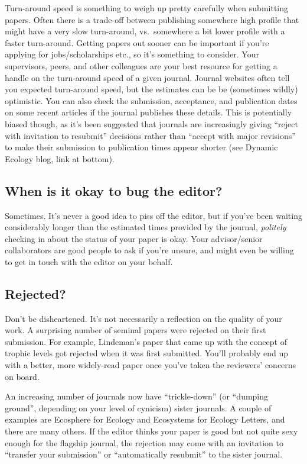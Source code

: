 \documentclass[11pt,]{article}
\begin{document}
Turn-around speed is something to weigh up pretty carefully when
submitting papers. Often there is a trade-off between publishing
somewhere high profile that might have a very slow turn-around,
vs.~somewhere a bit lower profile with a faster turn-around. Getting
papers out sooner can be important if you're applying for
jobs/scholarships etc., so it's something to consider. Your supervisors,
peers, and other colleagues are your best resource for getting a handle
on the turn-around speed of a given journal. Journal websites often tell
you expected turn-around speed, but the estimates can be be (sometimes
wildly) optimistic. You can also check the submission, acceptance, and
publication dates on some recent articles if the journal publishes these
details. This is potentially biased though, as it's been suggested that
journals are increasingly giving ``reject with invitation to resubmit''
decisions rather than ``accept with major revisions'' to make their
submission to publication times appear shorter (see Dynamic Ecology
blog, link at bottom).

\subsection{When is it okay to bug the
editor?}\label{when-is-it-okay-to-bug-the-editor}

Sometimes. It's never a good idea to piss off the editor, but if you've
been waiting considerably longer than the estimated times provided by
the journal, \emph{politely} checking in about the status of your paper
is okay. Your advisor/senior collaborators are good people to ask if
you're unsure, and might even be willing to get in touch with the editor
on your behalf.

\subsection{Rejected?}\label{rejected}

Don't be disheartened. It's not necessarily a reflection on the quality
of your work. A surprising number of seminal papers were rejected on
their first submission. For example, Lindeman's paper that came up with
the concept of trophic levels got rejected when it was first submitted.
You'll probably end up with a better, more widely-read paper once you've
taken the reviewers' concerns on board.

An increasing number of journals now have ``trickle-down'' (or ``dumping
ground'', depending on your level of cynicism) sister journals. A couple
of examples are Ecosphere for Ecology and Ecosystems for Ecology
Letters, and there are many others. If the editor thinks your paper is
good but not quite sexy enough for the flagship journal, the rejection
may come with an invitation to ``transfer your submission'' or
``automatically resubmit'' to the sister journal.
\end{document}
